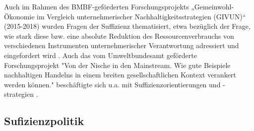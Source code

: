 \documentclass[a4paper,11pt,twoside]{scrartcl}
\begin{document}
Auch im Rahmen des BMBF-geförderten Forschungsprojekts „Gemeinwohl-Ökonomie im Vergleich unternehmerischer Nachhaltigkeitsstrategien (GIVUN)“ (2015-2018) wurden Fragen der Suffizienz thematisiert, etwa bezüglich der Frage, wie stark diese bzw. eine absolute Reduktion des Ressourcenverbrauchs von verschiedenen Instrumenten unternehmerischer Verantwortung adressiert und eingefordert wird \cite{Sommer2016b}.
Auch das vom Umweltbundesamt geförderte Forschungsprojekt "Von der Nische in den Mainstream. Wie gute Beispiele nachhaltigen Handelns in einem breiten gesellschaftlichen Kontext verankert werden können." beschäftigte sich u.a. mit Suffizienzorientierungen und -strategien \cite{Kny2015}.
    
\subsection*{Sufizienzpolitik}
\end{document}
